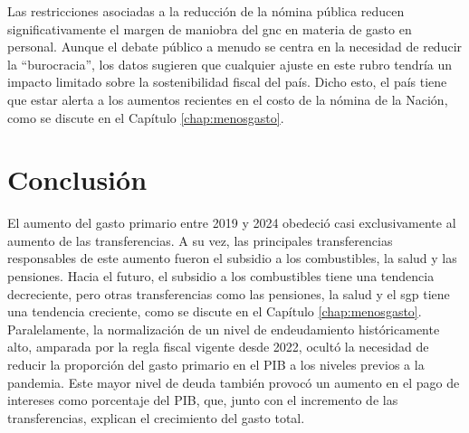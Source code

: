 Las restricciones asociadas a la reducción de la nómina pública reducen significativamente el margen de maniobra del \gls{gnc} en materia de gasto en personal. Aunque el debate público a menudo se centra en la necesidad de reducir la ``burocracia'', los datos sugieren que cualquier ajuste en este rubro tendría un impacto limitado sobre la sostenibilidad fiscal del país. Dicho esto, el país tiene que estar alerta a los aumentos recientes en el costo de la nómina de la Nación, como se discute en el Capítulo \ref{chap:menosgasto}.

\section{Conclusión}

El aumento del gasto primario entre 2019 y 2024 obedeció casi exclusivamente al aumento de las transferencias. A su vez, las principales transferencias responsables de este aumento fueron el subsidio a los combustibles, la salud y las pensiones. Hacia el futuro, el subsidio a los combustibles tiene una tendencia decreciente, pero otras transferencias como las pensiones, la salud y el \gls{sgp} tiene una tendencia creciente, como se discute en el Capítulo \ref{chap:menosgasto}. Paralelamente, la normalización de un nivel de endeudamiento históricamente alto, amparada por la regla fiscal vigente desde 2022, ocultó la necesidad de reducir la proporción del gasto primario en el PIB a los niveles previos a la pandemia. Este mayor nivel de deuda también provocó un aumento en el pago de intereses como porcentaje del PIB, que, junto con el incremento de las transferencias, explican el crecimiento del gasto total.

